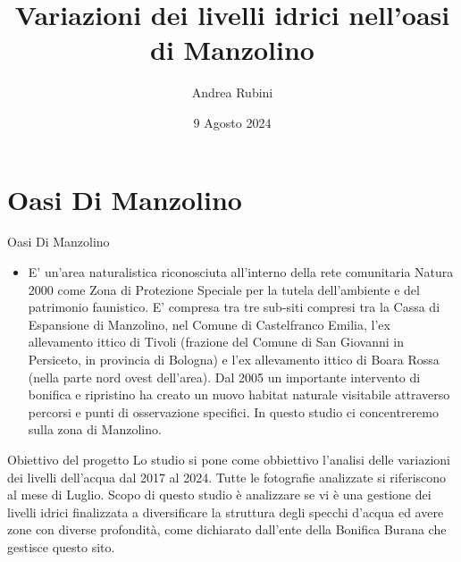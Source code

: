 \documentclass{beamer} %
\title{Variazioni dei livelli idrici nell'oasi di Manzolino}
\author{Andrea Rubini}
\date{9 Agosto 2024}
\begin{document}
\maketitle


\section{Oasi Di Manzolino}

        \begin{frame}{Oasi Di Manzolino}
            \begin{itemize}
            
                \item
                E' un'area naturalistica riconosciuta all'interno della rete comunitaria Natura 2000 come Zona di Protezione Speciale per la tutela dell'ambiente e del patrimonio faunistico. E' compresa tra tre sub-siti compresi tra la Cassa di Espansione di Manzolino, nel Comune di Castelfranco Emilia, l'ex allevamento ittico di Tivoli (frazione del Comune di San Giovanni in Persiceto, in provincia di Bologna) e l'ex allevamento ittico di Boara Rossa (nella parte nord ovest dell'area). Dal 2005 un importante intervento di bonifica e ripristino ha creato un nuovo habitat naturale visitabile attraverso percorsi e punti di osservazione specifici.
                In questo studio ci concentreremo sulla zona di Manzolino.
             
              

            \end{itemize}
        \end{frame}

        \begin{frame}{Obiettivo del progetto}
                Lo studio si pone come obbiettivo l'analisi delle variazioni dei livelli dell'acqua dal 2017 al 2024. Tutte le fotografie analizzate si riferiscono al mese di Luglio. Scopo di questo studio è analizzare se vi è una gestione dei livelli idrici finalizzata a diversificare la struttura degli specchi d'acqua ed avere zone con diverse profondità, come dichiarato dall'ente della Bonifica Burana che gestisce questo sito. 
                
        \end{frame}
\end{document}
